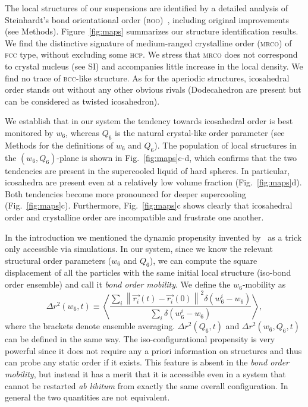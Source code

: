 The local structures of our suspensions are identified by a detailed analysis of Steinhardt's bond orientational order (\textsc{boo})~\citep{steinhardt1983boo}, including original improvements (see Methods). Figure~\ref{fig:maps} summarizes our structure identification results. We find the distinctive signature of medium-ranged crystalline order (\textsc{mrco}) of \textsc{fcc} type, without excluding some \textsc{hcp}. We stress that \textsc{mrco} does not correspond to crystal nucleus (see SI) and accompanies little increase in the local density. We find no trace of \textsc{bcc}-like structure. As for the aperiodic structures, icosahedral order stands out without any other obvious rivals (Dodecahedron are present but can be considered as twisted icosahedron). 



We establish that in our system the tendency towards icosahedral order is best monitored by $w_6$, whereas $Q_6$ is the natural crystal-like order parameter (see Methods for the definitions of $w_6$ and $Q_6$). The population of local structures in the $(w_6,Q_6)$-plane is shown in Fig.~\ref{fig:maps}c-d, which confirms that the two tendencies are present in the supercooled liquid of hard spheres. In particular, icosahedra are present even at a relatively low volume fraction (Fig.~\ref{fig:maps}d). Both tendencies become more pronounced for deeper supercooling (Fig.~\ref{fig:maps}c). Furthermore, Fig.~\ref{fig:maps}c shows clearly that icosahedral order and crystalline order are incompatible and frustrate one another.



In the introduction we mentioned the dynamic propensity invented by~\citet{Widmer-Cooper2005} as a trick only accessible via simulations. In our system, since we know the relevant structural order parameters ($w_6$ and $Q_6$), we can compute the square displacement of all the particles with the same initial local structure (iso-bond order ensemble) and call it \emph{bond order mobility}. We define the $w_6$-mobility as
\begin{equation}
	\Delta r^2(w_6, t) \equiv \left\langle \frac{
		\sum\limits_i{
			\left\|\vec{r_i}(t)-\vec{r_i}(0)\right\|^2 \delta(w_6^i-w_6)
			}
	}{
		\sum\limits_i{\delta(w_6^i-w_6)}
	}\right\rangle, 
	\label{eq:bo_propensity}
\end{equation}
where the brackets denote ensemble averaging. $\Delta r^2(Q_6, t)$ and $\Delta r^2(w_6, Q_6, t)$ can be defined in the same way. 
The iso-configurational propensity is very powerful since it does not require any a priori information on structures and thus can probe any static order if it exists. This feature is absent in the \emph{bond order mobility}, but instead it has a merit that it is accessible even in a system that cannot be restarted \emph{ab libitum} from exactly the same overall configuration. In general the two quantities are not equivalent.

